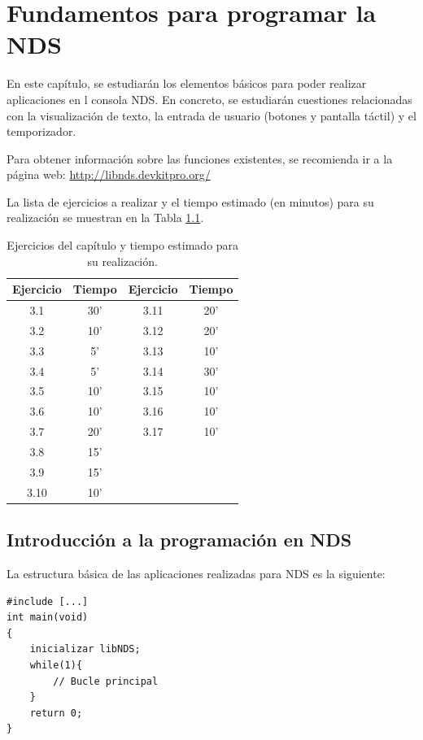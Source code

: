 \chapter{Fundamentos para programar la NDS}

En este capítulo, se estudiarán los elementos básicos para poder realizar aplicaciones en l consola NDS. En concreto, se estudiarán cuestiones relacionadas con la visualización de texto, la entrada de usuario (botones y pantalla táctil) y el temporizador. 

Para obtener información sobre las funciones existentes, se recomienda ir a la página web: \url{http://libnds.devkitpro.org/}

La lista de ejercicios a realizar y el tiempo estimado (en minutos) para su realización se muestran en la Tabla \ref{c3_tab:ejercios}.

\begin{table}[t]
\centering
\caption{Ejercicios del capítulo y tiempo estimado para su realización.}
\begin{tabular}{|c|c|c|c|}
\hline 
Ejercicio & Tiempo & Ejercicio & Tiempo  \\ 
\hline 
 3.1 & 30'  & 3.11 & 20' \\ 
 3.2 & 10'  & 3.12 & 20' \\ 
 3.3 & 5'   & 3.13 & 10' \\ 
 3.4 & 5'   & 3.14 & 30' \\ 
 3.5 & 10'  & 3.15 & 10' \\ 
 3.6 & 10'  & 3.16 & 10' \\ 
 3.7 & 20'  & 3.17 & 10'\\ 
 3.8 & 15'  & & \\ 
 3.9 & 15'  & & \\ 
 3.10 & 10' & & \\
\hline 
\end{tabular} 
\label{c3_tab:ejercios}
\end{table}
\section{Introducción a la programación en NDS}
La estructura básica de las aplicaciones realizadas para NDS es la siguiente:

\begin{lstlisting}
#include [...] 
int main(void)
{
	inicializar libNDS; 
	while(1){
		// Bucle principal 
	}
	return 0;
}
\end{lstlisting}

